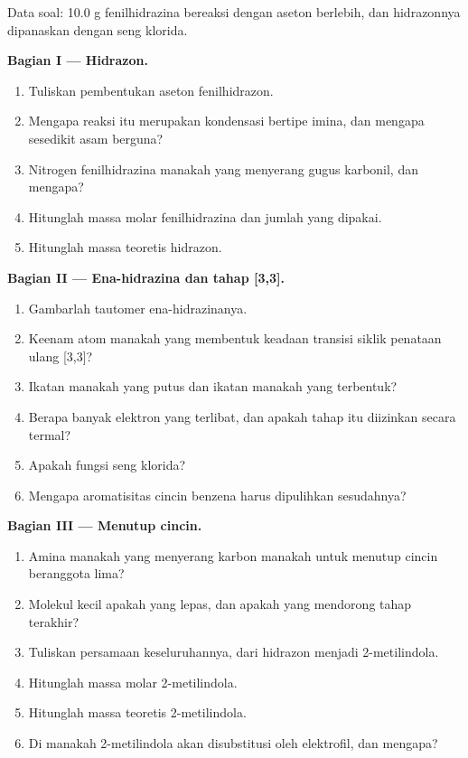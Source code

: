 \begin{problem}
\label{pb:b3:heterocycles:1}
Data soal: 10.0 g fenilhidrazina bereaksi dengan aseton berlebih, dan
hidrazonnya dipanaskan dengan seng klorida.

\medskip\noindent\textbf{Bagian I --- Hidrazon.}
\begin{enumerate}[beginpenalty=10000]
  \item Tuliskan pembentukan aseton fenilhidrazon.
  \item Mengapa reaksi itu merupakan kondensasi bertipe imina, dan mengapa sesedikit asam berguna?
  \item Nitrogen fenilhidrazina manakah yang menyerang gugus karbonil, dan mengapa?
  \item Hitunglah massa molar fenilhidrazina dan jumlah yang dipakai.
  \item Hitunglah massa teoretis hidrazon.
\end{enumerate}

\medskip\noindent\textbf{Bagian II --- Ena-hidrazina dan tahap [3,3].}
\begin{enumerate}[resume, beginpenalty=10000]
  \item Gambarlah tautomer ena-hidrazinanya.
  \item Keenam atom manakah yang membentuk keadaan transisi siklik penataan ulang [3,3]?
  \item Ikatan manakah yang putus dan ikatan manakah yang terbentuk?
  \item Berapa banyak elektron yang terlibat, dan apakah tahap itu diizinkan secara termal?
  \item Apakah fungsi seng klorida?
  \item Mengapa aromatisitas cincin benzena harus dipulihkan sesudahnya?
\end{enumerate}

\medskip\noindent\textbf{Bagian III --- Menutup cincin.}
\begin{enumerate}[resume, beginpenalty=10000]
  \item Amina manakah yang menyerang karbon manakah untuk menutup cincin beranggota lima?
  \item Molekul kecil apakah yang lepas, dan apakah yang mendorong tahap terakhir?
  \item Tuliskan persamaan keseluruhannya, dari hidrazon menjadi 2-metilindola.
  \item Hitunglah massa molar 2-metilindola.
  \item Hitunglah massa teoretis 2-metilindola.
  \item Di manakah 2-metilindola akan disubstitusi oleh elektrofil, dan mengapa?
\end{enumerate}


\end{problem}
